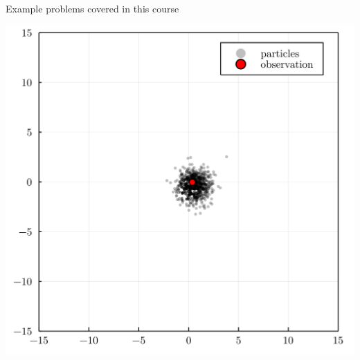 \begin{frame}[fragile]{Example problems covered in this course}
\begin{minipage}[b]{0.18\textwidth}
\end{minipage}
\hfill
\begin{minipage}[b]{0.18\textwidth}
    \centering
    \includegraphics[align=c, width=1.0\textwidth]{images/particle-filter.png}
\end{minipage}
\hfill
\begin{minipage}[b]{0.18\textwidth}
    \centering

\end{minipage}
\end{frame}
